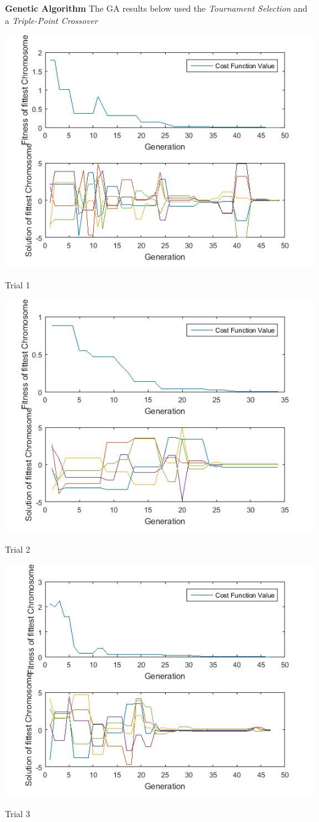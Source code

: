 \documentclass{article}
\begin{document}
\textbf{Genetic Algorithm} The GA results below used the \textit{Tournament Selection} and a \textit{Triple-Point Crossover}\\
\centerline{\includegraphics[width=0.5\linewidth]{ga_tf1_s1_c2a}}
\centerline{Trial 1}
\centerline{\includegraphics[width=0.5\linewidth]{ga_tf1_s1_c2b}}
\centerline{Trial 2}
\centerline{\includegraphics[width=0.5\linewidth]{ga_tf1_s1_c2c}}
\centerline{Trial 3}
\end{document}
